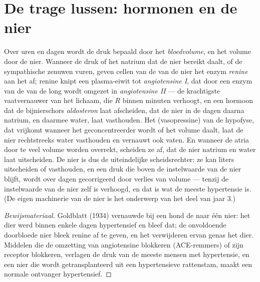 \section{De trage lussen: hormonen en de nier}

\begin{proposition}\label{prop:b2:blood-pressure:raas}
Over uren en dagen wordt de druk bepaald door het \emph{bloedvolume}, en het
volume door de nier. Wanneer de druk of het natrium dat de nier bereikt
daalt, of de sympathische zenuwen vuren, geven cellen van de  van
de nier het enzym \emph{renine} aan het  af; renine knipt een
plasma-eiwit tot \emph{angiotensine I}, dat door een enzym van de 
van de long wordt omgezet in \emph{angiotensine II} --- de krachtigste
vaatvernauwer van het lichaam, die $R$ binnen minuten verhoogt, en een
hormoon dat de bijnierschors \emph{aldosteron} laat afscheiden, dat de nier
in de dagen daarna natrium, en daarmee water, laat vasthouden. Het
\emph{} (vasopressine) van de hypofyse, dat vrijkomt
wanneer het  geconcentreerder wordt of het volume daalt, laat de nier
rechtstreeks water vasthouden en vernauwt ook vaten. En wanneer de atria door
te veel volume worden overrekt, scheiden ze \emph{} af,
dat de nier natrium en water laat uitscheiden. De nier is dus de uiteindelijke
scheidsrechter: ze kan liters uitscheiden of vasthouden, en een druk die boven
de instelwaarde van de nier blijft, wordt over dagen gecorrigeerd door verlies
van volume --- tenzij de instelwaarde van de nier zelf is verhoogd, en dat is
wat de meeste hypertensie is. (De eigen machinerie van de nier is het
onderwerp van het deel van jaar 3.)
\end{proposition}
\begin{proof}[Bewijsmateriaal]
Goldblatt (1934) vernauwde bij een hond de  naar één nier: het dier
werd binnen enkele dagen hypertensief en bleef dat; de onvoldoende
doorbloede nier bleek renine af te geven, en het verwijderen ervan genas het
dier. Middelen die de omzetting van angiotensine blokkeren (ACE-remmers) of
zijn receptor blokkeren, verlagen de druk van de meeste mensen met
hypertensie, en een nier die wordt getransplanteerd uit een hypertensieve
rattenstam, maakt een normale ontvanger hypertensief.
\end{proof}

